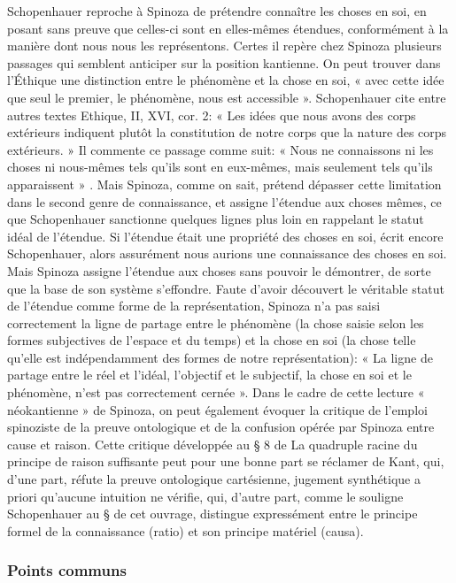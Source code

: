 Schopenhauer reproche à Spinoza de prétendre connaître les choses en soi, en posant sans preuve que
celles-ci sont en elles-mêmes étendues, conformément à la manière dont nous nous les représentons. Certes il repère chez Spinoza plusieurs passages qui semblent anticiper sur la position kantienne. On
peut trouver dans l’Éthique une distinction entre le phénomène et la chose en soi, « avec cette idée que seul
le premier, le phénomène, nous est accessible ». Schopenhauer cite entre autres textes Ethique,
II, XVI, cor. 2: « Les idées que nous avons des corps extérieurs indiquent plutôt la constitution de notre corps
que la nature des corps extérieurs. » Il commente ce passage comme suit: « Nous ne connaissons ni les
choses ni nous-mêmes tels qu’ils sont en eux-mêmes, mais seulement tels qu’ils apparaissent » . Mais
Spinoza, comme on sait, prétend dépasser cette limitation dans le second genre de connaissance, et assigne
l’étendue aux choses mêmes, ce que Schopenhauer sanctionne quelques lignes plus loin en rappelant le statut
idéal de l’étendue.
Si l’étendue était une propriété des choses en soi, écrit encore Schopenhauer, alors assurément nous
aurions une connaissance des choses en soi. Mais Spinoza assigne l’étendue aux choses sans pouvoir le
démontrer, de sorte que la base de son système s’effondre. Faute d’avoir découvert le véritable statut de
l’étendue comme forme de la représentation, Spinoza n’a pas saisi correctement la ligne de partage entre le
phénomène (la chose saisie selon les formes subjectives de l’espace et du temps) et la chose en soi (la chose
telle qu’elle est indépendamment des formes de notre représentation): « La ligne de partage entre le réel et
l’idéal, l’objectif et le subjectif, la chose en soi et le phénomène, n’est pas correctement cernée ».
Dans le cadre de cette lecture « néokantienne » de Spinoza, on peut également évoquer la critique de
l’emploi spinoziste de la preuve ontologique et de la confusion opérée par Spinoza entre cause et raison.
Cette critique développée au § 8 de La quadruple racine du principe de raison suffisante peut pour une
bonne part se réclamer de Kant, qui, d’une part, réfute la preuve ontologique cartésienne, jugement
synthétique a priori qu’aucune intuition ne vérifie, qui, d’autre part, comme le souligne Schopenhauer au §
 de cet ouvrage, distingue expressément entre le principe formel de la connaissance (ratio) et son principe
matériel (causa).

\subsubsection{Points communs}

